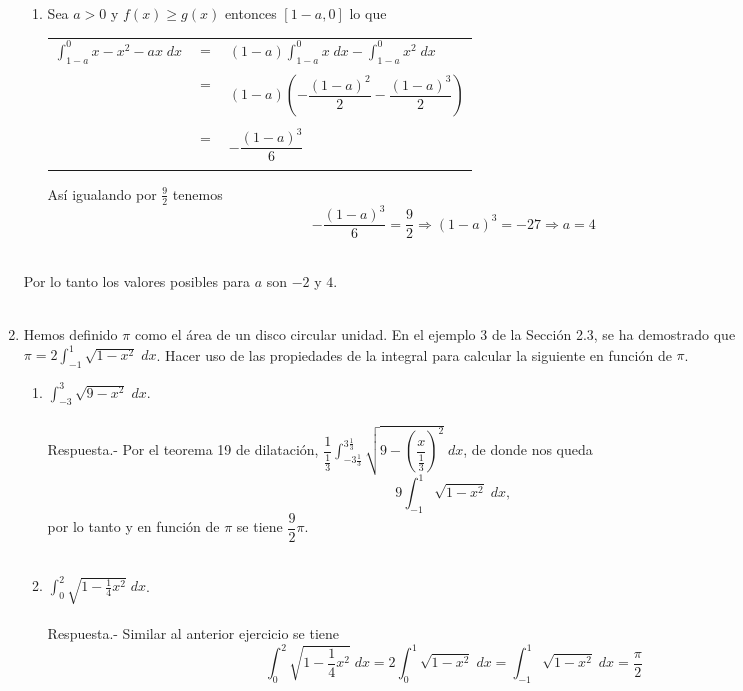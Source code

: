\begin{enumerate}[\bfseries 1.]
\begin{enumerate}[\bfseries C 1.]
	\item Sea $a>0$ y  $f(x)\geq g(x)$ entonces $[1-a,0]$ lo que 
	    \begin{center}
		\begin{tabular}{rcl}
		    $\displaystyle\int_{1-a}^0 x-x^2-ax \; dx$&$=$&$\displaystyle(1-a)\int_{1-a}^0 x\; dx  - \int_{1-a}^0 x^2 \; dx$\\\\ 
		    &$=$&$(1-a)\left(-\dfrac{(1-a)^2}{2} - \dfrac{(1-a)^3}{2}\right)$\\\\
		    &$=$&$-\dfrac{(1-a)^3}{6}$\\\\
		\end{tabular}
	    \end{center}
	    Así igualando por $\frac{9}{2}$ tenemos 
	    $$-\dfrac{(1-a)^3}{6} = \dfrac{9}{2} \Longrightarrow (1-a)^3 = -27 \Longrightarrow a=4$$\\
    \end{enumerate}
    Por lo tanto los valores posibles para $a$ son $-2$ y $4$.\\\\

\item Hemos definido $\pi$ como el área de un disco circular unidad. En el ejemplo 3 de la Sección 2.3, se ha demostrado que $\pi=2 \int_{-1}^1 \sqrt{1-x^2}\; dx$. Hacer uso de las propiedades de la integral para calcular la siguiente en función de $\pi$.
\begin{enumerate}[\bfseries (a)]

    \item $\displaystyle\int_{-3}^3 \sqrt{9-x^2}\; dx$.\\\\
	Respuesta.-\; Por el teorema 19 de dilatación, $\dfrac{1}{\frac{1}{3}}\displaystyle\int_{-3\frac{1}{3}}^{3\frac{1}{3}} \sqrt{9 - \left(\dfrac{x}{\frac{1}{3}}\right)^2} \; dx$, de donde nos queda 
	$$9 \displaystyle\int_{-1}^1 \sqrt{1-x^2}\; dx,$$ 
	por lo tanto y en función de $\pi$ se tiene $\dfrac{9}{2} \pi$.\\\\

    \item $\displaystyle\int_0^2 \sqrt{1-\frac{1}{4}x^2}\; dx$.\\\\
	Respuesta.-\; Similar al anterior ejercicio se tiene 
	$$\int_0^2 \sqrt{1-\dfrac{1}{4}x^2}\; dx = 2\int_0^1 \sqrt{1-x^2}\; dx = \int_{-1}^1 \sqrt{1-x^2}\; dx = \dfrac{\pi}{2}$$\\


\end{enumerate}
\end{enumerate}
